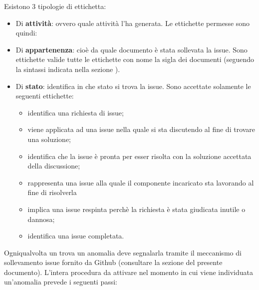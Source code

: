	        Esistono 3 tipologie di ettichetta:
	        \begin{itemize}
	            \item Di \textbf{attività}: ovvero quale attività l'ha generata. Le ettichette permesse sono quindi: 
	            \item Di \textbf{appartenenza}: cioè da quale documento è stata sollevata la issue. Sono ettichette valide tutte le ettichette con nome la sigla dei documenti (seguendo la sintassi indicata nella sezione ).
	            \item Di \textbf{stato}: identifica in che stato si trova la issue. Sono accettate solamente le seguenti ettichette:
                \begin{itemize}
                    \item {} identifica una richiesta di issue;
                    \item {} viene applicata ad una issue nella quale si sta discutendo al fine di trovare una soluzione;
                    \item {} identifica che la issue è pronta per esser risolta con la soluzione accettata della discussione;
                    \item {} rappresenta una issue alla quale il componente incaricato sta lavorando al fine di risolverla
                    \item {} implica una issue respinta perchè la richiesta è stata giudicata inutile o dannosa;
                    \item {} identifica una issue completata.
                \end{itemize}
	        \end{itemize}
	        Ogniqualvolta un  trova un anomalia deve segnalarla tramite il meccanismo di sollevamento issue fornito da Github (consultare la sezione  del presente documento). L'intera procedura da attivare nel momento in cui viene individuata un'anomalia prevede i seguenti passi:
